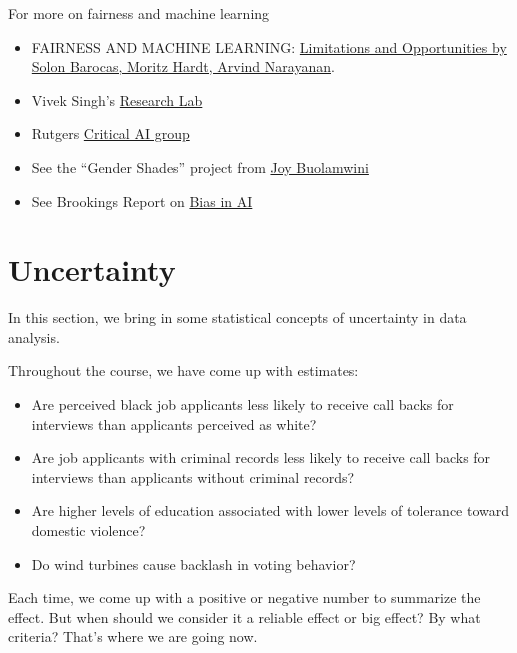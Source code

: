 \documentclass[
  letterpaper,
  DIV=11,
  numbers=noendperiod]{scrreprt}
\providecommand{\tightlist}{%
  \setlength{\itemsep}{0pt}\setlength{\parskip}{0pt}}\usepackage{longtable,booktabs,array}
\begin{document}
For more on fairness and machine learning

\begin{itemize}
\tightlist
\item
  FAIRNESS AND MACHINE LEARNING:
  \href{https://fairmlbook.org/}{Limitations and Opportunities by Solon
  Barocas, Moritz Hardt, Arvind Narayanan}.
\item
  Vivek Singh's \href{http://behavioralinformatics.org/}{Research Lab}
\item
  Rutgers
  \href{https://sites.rutgers.edu/critical-ai/event-details/}{Critical
  AI group}
\item
  See the ``Gender Shades'' project from
  \href{https://www.youtube.com/watch?v=TWWsW1w-BVo}{Joy Buolamwini}
\item
  See Brookings Report on
  \href{https://www.brookings.edu/research/algorithmic-bias-detection-and-mitigation-best-practices-and-policies-to-reduce-consumer-harms/}{Bias
  in AI}
\end{itemize}


\hypertarget{uncertainty}{%
\chapter{Uncertainty}\label{uncertainty}}

In this section, we bring in some statistical concepts of uncertainty in
data analysis.

Throughout the course, we have come up with estimates:

\begin{itemize}
\item
  Are perceived black job applicants less likely to receive call backs
  for interviews than applicants perceived as white?
\item
  Are job applicants with criminal records less likely to receive call
  backs for interviews than applicants without criminal records?
\item
  Are higher levels of education associated with lower levels of
  tolerance toward domestic violence?

  \item

  Do wind turbines cause backlash in voting behavior?
\end{itemize}

Each time, we come up with a positive or negative number to summarize
the effect. But when should we consider it a reliable effect or big
effect? By what criteria? That's where we are going now.
\end{document}
